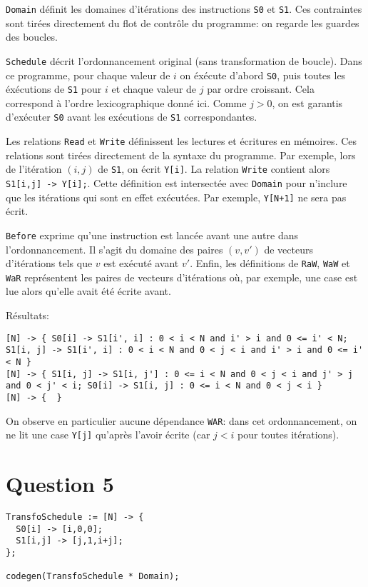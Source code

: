 \documentclass{article}
\begin{document}
\lstinline{Domain} définit les domaines d'itérations des instructions \lstinline{S0} et \lstinline{S1}.
Ces contraintes sont tirées directement du flot de contrôle du programme: on regarde les guardes des boucles.

\lstinline{Schedule} décrit l'ordonnancement original (sans transformation de boucle).
Dans ce programme, pour chaque valeur de $i$ on éxécute d'abord \lstinline{S0}, puis toutes les éxécutions de \lstinline{S1} pour $i$ et chaque valeur de $j$ par ordre croissant.
Cela correspond à l'ordre lexicographique donné ici. Comme $j>0$, on est garantis d'exécuter \lstinline{S0} avant les exécutions de \lstinline{S1} correspondantes.

Les relations \lstinline{Read} et \lstinline{Write} définissent les lectures et écritures en mémoires.
Ces relations sont tirées directement de la syntaxe du programme.
Par exemple, lors de l'itération $(i,j)$ de \lstinline{S1}, on écrit \lstinline{Y[i]}.
La relation \lstinline{Write} contient alors \lstinline{ S1[i,j] -> Y[i];}.
Cette définition est intersectée avec \lstinline{Domain} pour n'inclure que les itérations qui sont en effet exécutées. Par exemple, \lstinline{Y[N+1]} ne sera pas écrit.

\lstinline{Before} exprime qu'une instruction est lancée avant une autre dans l'ordonnancement.
Il s'agit du domaine des paires $(v,v')$ de vecteurs d'itérations tels que $v$ est exécuté avant $v'$.
Enfin, les définitions de \lstinline{RaW}, \lstinline{WaW} et \lstinline{WaR} représentent les paires de vecteurs d'itérations où, par exemple, une case est lue alors qu'elle avait été écrite avant.

Résultats:
\begin{lstlisting}
[N] -> { S0[i] -> S1[i', i] : 0 < i < N and i' > i and 0 <= i' < N; S1[i, j] -> S1[i', i] : 0 < i < N and 0 < j < i and i' > i and 0 <= i' < N }
[N] -> { S1[i, j] -> S1[i, j'] : 0 <= i < N and 0 < j < i and j' > j and 0 < j' < i; S0[i] -> S1[i, j] : 0 <= i < N and 0 < j < i }
[N] -> {  }
\end{lstlisting}

On observe en particulier aucune dépendance \lstinline{WAR}: dans cet ordonnancement, on ne lit une case \lstinline{Y[j]} qu'après l'avoir écrite (car $j<i$ pour toutes itérations).

\section*{Question 5}
\begin{lstlisting}
TransfoSchedule := [N] -> {
  S0[i] -> [i,0,0];
  S1[i,j] -> [j,1,i+j];
};

codegen(TransfoSchedule * Domain);
\end{lstlisting}
\end{document}
